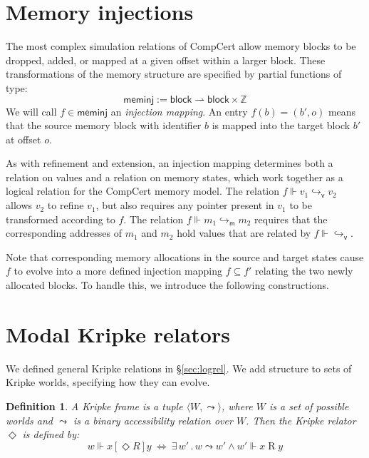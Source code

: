 \documentclass[draft,11pt]{report}
\newtheorem{definition}{Definition}
\newcommand{\kw}[1]{\ensuremath{ \mathsf{#1} }}
\newcommand{\ifr}[1]{\mathrel{[{#1}]}}
\begin{document}

\section{Memory injections} \label{sec:meminj} %

The most complex simulation relations of CompCert
allow memory blocks to be dropped, added, or
mapped at a given offset within a larger block.
These transformations of the memory structure
are specified by partial functions of type:
\[
  \kw{meminj} := \kw{block} \rightharpoonup \kw{block} \times \mathbb{Z}
\]
We will call $f \in \kw{meminj}$
an \emph{injection mapping}.
An entry $f(b) = (b', o)$
means that the source memory block with identifier $b$
is mapped into the target block $b'$
at offset $o$.

As with refinement and extension,
an injection mapping determines both
a relation on values and
a relation on memory states,
which work together
as a logical relation for the CompCert memory model.
The relation $f \Vdash v_1 \hookrightarrow_\kw{v} v_2$
allows $v_2$ to refine $v_1$,
but also requires any pointer present in $v_1$ 
to be transformed according to $f$.
The relation $f \Vdash m_1 \hookrightarrow_\kw{m} m_2$
requires that the corresponding addresses of $m_1$ and $m_2$
hold values that are related by $f \Vdash {\hookrightarrow_\kw{v}}$.

Note that corresponding memory allocations
in the source and target states cause $f$ to
evolve into a more defined injection mapping $f \subseteq f'$
relating the two newly allocated blocks.
To handle this,
we introduce the following constructions.


\section{Modal Kripke relators} %

We defined general Kripke relations in \S\ref{sec:logrel}.
We add structure to sets of Kripke worlds,
specifying how they can evolve.

\begin{definition} %
A \emph{Kripke frame} is a tuple
$\langle W, {\leadsto} \rangle$, where
$W$ is a set of \emph{possible worlds} and
$\leadsto$ is a
binary \emph{accessibility relation} over $W$.
Then the Kripke relator $\Diamond$ is defined by:
\[
  w \Vdash x \ifr{\Diamond R} y \: \Leftrightarrow \:
    \exists \, w' \,.\, w \leadsto w' \wedge
      w' \Vdash x \mathrel{R} y
\]
\end{definition}
\end{document}
